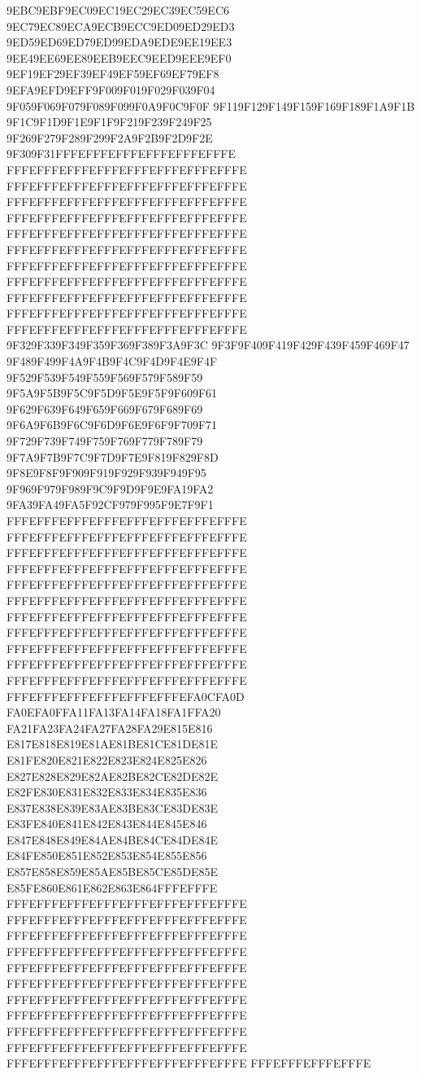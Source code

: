9EBC9EBF9EC09EC19EC29EC39EC59EC6
9EC79EC89ECA9ECB9ECC9ED09ED29ED3
9ED59ED69ED79ED99EDA9EDE9EE19EE3
9EE49EE69EE89EEB9EEC9EED9EEE9EF0
9EF19EF29EF39EF49EF59EF69EF79EF8
9EFA9EFD9EFF9F009F019F029F039F04
9F059F069F079F089F099F0A9F0C9F0F
9F119F129F149F159F169F189F1A9F1B
9F1C9F1D9F1E9F1F9F219F239F249F25
9F269F279F289F299F2A9F2B9F2D9F2E
9F309F31FFFEFFFEFFFEFFFEFFFEFFFE
FFFEFFFEFFFEFFFEFFFEFFFEFFFEFFFE
FFFEFFFEFFFEFFFEFFFEFFFEFFFEFFFE
FFFEFFFEFFFEFFFEFFFEFFFEFFFEFFFE
FFFEFFFEFFFEFFFEFFFEFFFEFFFEFFFE
FFFEFFFEFFFEFFFEFFFEFFFEFFFEFFFE
FFFEFFFEFFFEFFFEFFFEFFFEFFFEFFFE
FFFEFFFEFFFEFFFEFFFEFFFEFFFEFFFE
FFFEFFFEFFFEFFFEFFFEFFFEFFFEFFFE
FFFEFFFEFFFEFFFEFFFEFFFEFFFEFFFE
FFFEFFFEFFFEFFFEFFFEFFFEFFFEFFFE
FFFEFFFEFFFEFFFEFFFEFFFEFFFEFFFE
9F329F339F349F359F369F389F3A9F3C
9F3F9F409F419F429F439F459F469F47
9F489F499F4A9F4B9F4C9F4D9F4E9F4F
9F529F539F549F559F569F579F589F59
9F5A9F5B9F5C9F5D9F5E9F5F9F609F61
9F629F639F649F659F669F679F689F69
9F6A9F6B9F6C9F6D9F6E9F6F9F709F71
9F729F739F749F759F769F779F789F79
9F7A9F7B9F7C9F7D9F7E9F819F829F8D
9F8E9F8F9F909F919F929F939F949F95
9F969F979F989F9C9F9D9F9E9FA19FA2
9FA39FA49FA5F92CF979F995F9E7F9F1
FFFEFFFEFFFEFFFEFFFEFFFEFFFEFFFE
FFFEFFFEFFFEFFFEFFFEFFFEFFFEFFFE
FFFEFFFEFFFEFFFEFFFEFFFEFFFEFFFE
FFFEFFFEFFFEFFFEFFFEFFFEFFFEFFFE
FFFEFFFEFFFEFFFEFFFEFFFEFFFEFFFE
FFFEFFFEFFFEFFFEFFFEFFFEFFFEFFFE
FFFEFFFEFFFEFFFEFFFEFFFEFFFEFFFE
FFFEFFFEFFFEFFFEFFFEFFFEFFFEFFFE
FFFEFFFEFFFEFFFEFFFEFFFEFFFEFFFE
FFFEFFFEFFFEFFFEFFFEFFFEFFFEFFFE
FFFEFFFEFFFEFFFEFFFEFFFEFFFEFFFE
FFFEFFFEFFFEFFFEFFFEFFFEFA0CFA0D
FA0EFA0FFA11FA13FA14FA18FA1FFA20
FA21FA23FA24FA27FA28FA29E815E816
E817E818E819E81AE81BE81CE81DE81E
E81FE820E821E822E823E824E825E826
E827E828E829E82AE82BE82CE82DE82E
E82FE830E831E832E833E834E835E836
E837E838E839E83AE83BE83CE83DE83E
E83FE840E841E842E843E844E845E846
E847E848E849E84AE84BE84CE84DE84E
E84FE850E851E852E853E854E855E856
E857E858E859E85AE85BE85CE85DE85E
E85FE860E861E862E863E864FFFEFFFE
FFFEFFFEFFFEFFFEFFFEFFFEFFFEFFFE
FFFEFFFEFFFEFFFEFFFEFFFEFFFEFFFE
FFFEFFFEFFFEFFFEFFFEFFFEFFFEFFFE
FFFEFFFEFFFEFFFEFFFEFFFEFFFEFFFE
FFFEFFFEFFFEFFFEFFFEFFFEFFFEFFFE
FFFEFFFEFFFEFFFEFFFEFFFEFFFEFFFE
FFFEFFFEFFFEFFFEFFFEFFFEFFFEFFFE
FFFEFFFEFFFEFFFEFFFEFFFEFFFEFFFE
FFFEFFFEFFFEFFFEFFFEFFFEFFFEFFFE
FFFEFFFEFFFEFFFEFFFEFFFEFFFEFFFE
FFFEFFFEFFFEFFFEFFFEFFFEFFFEFFFE
FFFEFFFEFFFEFFFE
